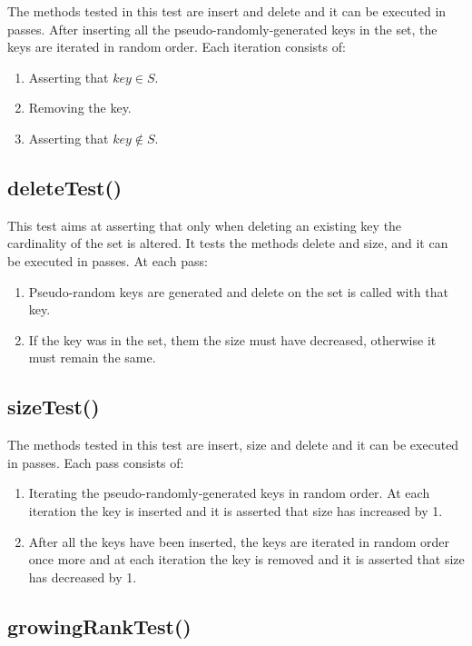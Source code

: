 The methods tested in this test are {\ttfamily insert} and {\ttfamily delete} and it can be executed in passes. After inserting all the pseudo-randomly-generated keys in the set, the keys are iterated in random order. Each iteration consists of:
\begin{enumerate}
    \item Asserting that $key \in S$.
    \item Removing the key.
    \item Asserting that $key \not\in S$.
\end{enumerate}

\subsection{{\ttfamily deleteTest()}}

This test aims at asserting that only when deleting an existing key the cardinality of the set is altered. It tests the methods {\ttfamily delete} and size, and it can be executed in passes. At each pass:
\begin{enumerate}
    \item
    Pseudo-random keys are generated and delete on the set is called with that key.
    \item
    If the key was in the set, them the size must have decreased, otherwise it must remain the same.
\end{enumerate}

\subsection{{\ttfamily sizeTest()}}

The methods tested in this test are {\ttfamily insert}, {\ttfamily size} and {\ttfamily delete} and it can be executed in passes. Each pass consists of:
\begin{enumerate}
    \item
    Iterating the pseudo-randomly-generated keys in random order. At each iteration the key is inserted and it is asserted that {\ttfamily size} has increased by 1.
    \item
    After all the keys have been inserted, the keys are iterated in random order once more and at each iteration the key is removed and it is asserted that {\ttfamily size} has decreased by 1.
\end{enumerate}

\subsection{{\ttfamily growingRankTest()}}

